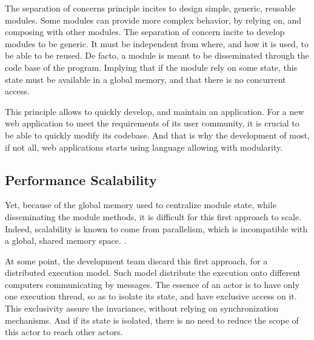The separation of concerns principle incites to design simple, generic, reusable modules. 
Some modules can provide more complex behavior, by relying on, and composing with other modules.
The separation of concern incite to develop modules to be generic.
It must be independent from where, and how it is used, to be able to be reused.
De facto, a module is meant to be disseminated through the code base of the program.
Implying that if the module rely on some state, this state must be available in a global memory, and that there is no concurrent access.

This principle allows to quickly develop, and maintain an application.
For a new web application to meet the requirements of its user community, it is crucial to be able to quickly modify its codebase.
And that is why the development of most, if not all, web applications starts using language allowing with modularity.


\subsection{Performance Scalability}



Yet, because of the global memory used to centralize module state, while disseminating the module methods, it is difficult for this first approach to scale.
Indeed, scalability is known to come from parallelism, which is incompatible with a global, shared memory space.
.

At some point, the development team discard this first approach, for a distributed execution model.
Such model distribute the execution onto different computers communicating by messages.
The essence of an actor is to have only one execution thread, so as to isolate its state, and have exclusive access on it.
This exclusivity assure the invariance, without relying on synchronization mechanisms.
And if its state is isolated, there is no need to reduce the scope of this actor to reach other actors.

